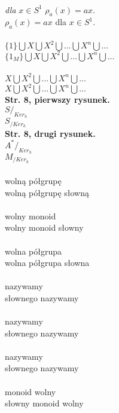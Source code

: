 \documentclass[a4paper,11pt]{article}
\begin{document}
\noindent
{} \\
\Jest  \textit{dla} $x \in S^{ 1 }$ $\rho_{ a }( x )= a x$. \\
\Powin $\rho_{ a }( x ) = a x$ dla $x \in S^{ 1 }$. \\
 \\
\Jest  $\{ 1 \} \bigcup X \bigcup X^{ 2 } \bigcup ... \bigcup X^{ n } \bigcup \ldots$ \\
\Powin $\{ 1_{ M } \} \bigcup X \bigcup X^{ 2 } \bigcup \ldots \bigcup X^{ n } \bigcup \ldots$ \\
 \\
\Jest  $X \bigcup X^{ 2 } \bigcup ... \bigcup X^{ n } \bigcup \ldots$ \\
\Powin $X \bigcup X^{ 2 } \bigcup \ldots \bigcup X^{ n } \bigcup \ldots$ \\
\textbf{Str. 8, pierwszy rysunek.} \\
\Jest  $S /_{ Ker_{ h } }$ \\
\Powin $S_{ / Ker_{ h } }$ \\
\textbf{Str. 8, drugi rysunek.} \\
\Jest  $A^{ * } /_{ Ker_{ h } }$ \\
\Powin $M_{ / Ker_{ h } }$ \\
 \\
\Jest  wolną półgrupę \\
\Powin wolną półgrupę słowną \\
 \\
\Jest  wolny monoid \\
\Powin wolny monoid słowny \\
 \\
\Jest  wolna półgrupa \\
\Powin wolna półgrupa słowna \\
 \\
\Jest  nazywamy \\
\Powin słownego nazywamy \\
 \\
\Jest  nazywamy \\
\Powin słownego nazywamy \\
 \\
\Jest  nazywamy \\
\Powin słownego nazywamy \\
 \\
\Jest  monoid wolny \\
\Powin słowny monoid wolny \\
\end{document}
